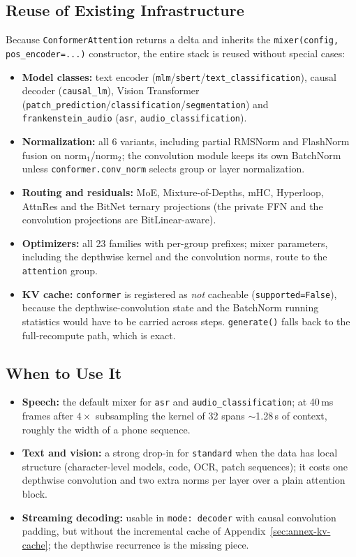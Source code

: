 \subsection{Reuse of Existing Infrastructure}

Because \texttt{ConformerAttention} returns a delta and inherits the \texttt{mixer(config, pos\_encoder=...)} constructor, the entire stack is reused without special cases:

\begin{itemize}[leftmargin=*]
    \item \textbf{Model classes:} text encoder (\texttt{mlm}/\texttt{sbert}/\texttt{text\_classification}), causal decoder (\texttt{causal\_lm}), Vision Transformer (\texttt{patch\_prediction}/\texttt{classification}/\texttt{segmentation}) and \texttt{frankenstein\_audio} (\texttt{asr}, \texttt{audio\_classification}).
    \item \textbf{Normalization:} all 6 variants, including partial RMSNorm and FlashNorm fusion on $\mathrm{norm}_1$/$\mathrm{norm}_2$; the convolution module keeps its own BatchNorm unless \texttt{conformer.conv\_norm} selects group or layer normalization.
    \item \textbf{Routing and residuals:} MoE, Mixture-of-Depths, mHC, Hyperloop, AttnRes and the BitNet ternary projections (the private FFN and the convolution projections are BitLinear-aware).
    \item \textbf{Optimizers:} all 23 families with per-group prefixes; mixer parameters, including the depthwise kernel and the convolution norms, route to the \texttt{attention} group.
    \item \textbf{KV cache:} \texttt{conformer} is registered as \emph{not} cacheable (\texttt{supported=False}), because the depthwise-convolution state and the BatchNorm running statistics would have to be carried across steps. \texttt{generate()} falls back to the full-recompute path, which is exact.
\end{itemize}

\subsection{When to Use It}

\begin{itemize}[leftmargin=*]
    \item \textbf{Speech:} the default mixer for \texttt{asr} and \texttt{audio\_classification}; at 40\,ms frames after $4\times$ subsampling the kernel of 32 spans $\sim$1.28\,s of context, roughly the width of a phone sequence.
    \item \textbf{Text and vision:} a strong drop-in for \texttt{standard} when the data has local structure (character-level models, code, OCR, patch sequences); it costs one depthwise convolution and two extra norms per layer over a plain attention block.
    \item \textbf{Streaming decoding:} usable in \texttt{mode: decoder} with causal convolution padding, but without the incremental cache of Appendix~\ref{sec:annex-kv-cache}; the depthwise recurrence is the missing piece.
\end{itemize}
